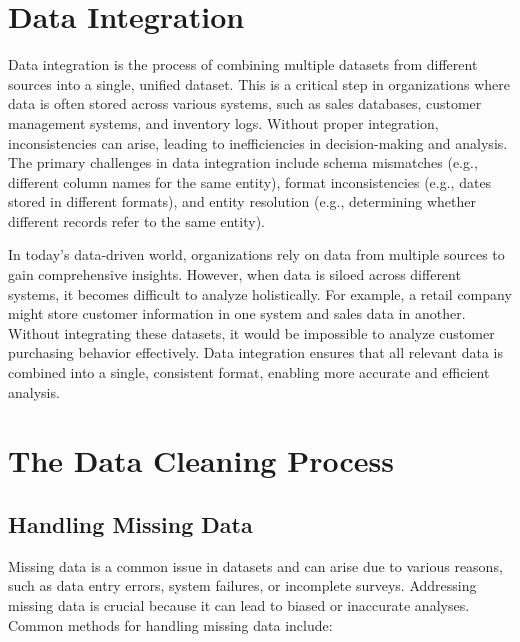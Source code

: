 \documentclass[12pt]{article}
\begin{document}
\section{Data Integration}
Data integration is the process of combining multiple datasets from different sources into a single, unified dataset. This is a critical step in organizations where data is often stored across various systems, such as sales databases, customer management systems, and inventory logs. Without proper integration, inconsistencies can arise, leading to inefficiencies in decision-making and analysis. The primary challenges in data integration include schema mismatches (e.g., different column names for the same entity), format inconsistencies (e.g., dates stored in different formats), and entity resolution (e.g., determining whether different records refer to the same entity).

In today’s data-driven world, organizations rely on data from multiple sources to gain comprehensive insights. However, when data is siloed across different systems, it becomes difficult to analyze holistically. For example, a retail company might store customer information in one system and sales data in another. Without integrating these datasets, it would be impossible to analyze customer purchasing behavior effectively. Data integration ensures that all relevant data is combined into a single, consistent format, enabling more accurate and efficient analysis.


\section{The Data Cleaning Process}

\subsection{Handling Missing Data}
Missing data is a common issue in datasets and can arise due to various reasons, such as data entry errors, system failures, or incomplete surveys. Addressing missing data is crucial because it can lead to biased or inaccurate analyses. Common methods for handling missing data include:
\end{document}
